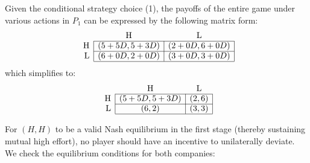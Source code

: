 \documentclass[twoside]{article}
\theoremstyle{definitionstyle}
\begin{document}
Given the conditional strategy choice (1), the payoffs of the entire game under various actions in $P_1$ can be expressed by the following matrix form:
\[
\begin{array}{r|c|c|}
\multicolumn{1}{r}{} & \multicolumn{1}{c}{\text{H}} & \multicolumn{1}{c}{\text{L}} \\ \cline{2-3}
\text{H} & (5 + 5D, 5 + 3D) & (2 + 0D, 6 + 0D) \\ \cline{2-3}
\text{L} & (6 + 0D, 2 + 0D) & (3 + 0D, 3 + 0D) \\ \cline{2-3}
\end{array}
\]
which simplifies to:
\[
\begin{array}{r|c|c|}
\multicolumn{1}{r}{} & \multicolumn{1}{c}{\text{H}} & \multicolumn{1}{c}{\text{L}} \\ \cline{2-3}
\text{H} & (5 + 5D, 5 + 3D) & (2, 6) \\ \cline{2-3}
\text{L} & (6, 2) & (3, 3) \\ \cline{2-3}
\end{array}
\]

For $(H,H)$ to be a valid Nash equilibrium in the first stage (thereby sustaining mutual high effort), no player should have an incentive to unilaterally deviate. We check the equilibrium conditions for both companies:\\
\end{document}
